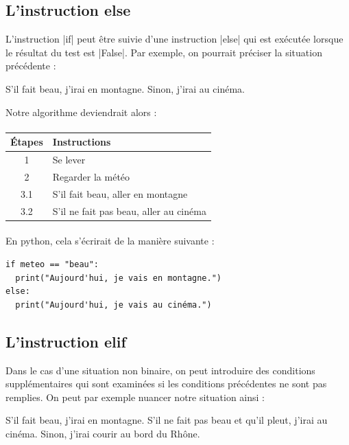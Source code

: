 \documentclass[11pt, a4paper]{book}
\begin{document}
\subsection{L'instruction \textsf{else}}
L'instruction |if| peut être suivie d'une instruction |else| qui est exécutée lorsque le résultat du test est |False|. Par exemple, on pourrait préciser la situation précédente :  
 \begin{example} S'il fait beau, j'irai en montagne. Sinon, j'irai au cinéma. \end{example}
 Notre algorithme deviendrait alors : 
\paragraph{}
\begin{tabular}{ c  l  }
     Étapes & Instructions \\ \hline
     1 & Se lever  \\ 
     2 & Regarder la météo  \\
     3.1 & S'il fait beau, aller en montagne  \\
     3.2 & S'il ne fait pas beau, aller au cinéma  \\
\end{tabular}

\paragraph{}
En python, cela s'écrirait de la manière suivante :

\begin{lstlisting}
if meteo == "beau":
  print("Aujourd'hui, je vais en montagne.")
else:
  print("Aujourd'hui, je vais au cinéma.")
\end{lstlisting}

\subsection{L'instruction \textsf{elif}}
Dans le cas d'une situation non binaire, on peut introduire des conditions supplémentaires qui sont examinées si les conditions précédentes ne sont pas remplies. On peut par exemple nuancer notre situation ainsi : 

 \begin{example} S'il fait beau, j'irai en montagne. S'il ne fait pas beau et qu'il pleut, j'irai au cinéma. Sinon, j'irai courir au bord du Rhône. \end{example}
 
\end{document}
